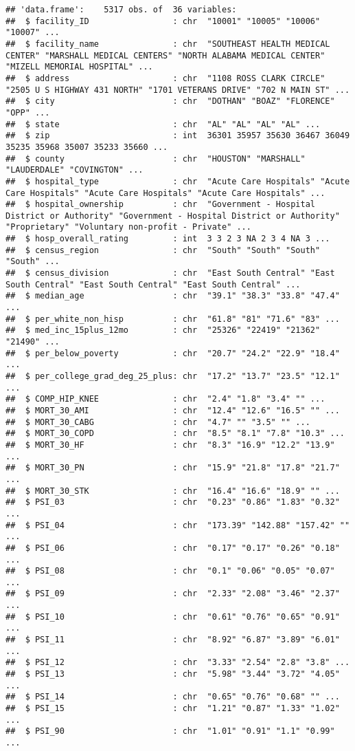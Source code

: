 \documentclass[
]{article}
\begin{document}
\begin{verbatim}
## 'data.frame':    5317 obs. of  36 variables:
##  $ facility_ID                 : chr  "10001" "10005" "10006" "10007" ...
##  $ facility_name               : chr  "SOUTHEAST HEALTH MEDICAL CENTER" "MARSHALL MEDICAL CENTERS" "NORTH ALABAMA MEDICAL CENTER" "MIZELL MEMORIAL HOSPITAL" ...
##  $ address                     : chr  "1108 ROSS CLARK CIRCLE" "2505 U S HIGHWAY 431 NORTH" "1701 VETERANS DRIVE" "702 N MAIN ST" ...
##  $ city                        : chr  "DOTHAN" "BOAZ" "FLORENCE" "OPP" ...
##  $ state                       : chr  "AL" "AL" "AL" "AL" ...
##  $ zip                         : int  36301 35957 35630 36467 36049 35235 35968 35007 35233 35660 ...
##  $ county                      : chr  "HOUSTON" "MARSHALL" "LAUDERDALE" "COVINGTON" ...
##  $ hospital_type               : chr  "Acute Care Hospitals" "Acute Care Hospitals" "Acute Care Hospitals" "Acute Care Hospitals" ...
##  $ hospital_ownership          : chr  "Government - Hospital District or Authority" "Government - Hospital District or Authority" "Proprietary" "Voluntary non-profit - Private" ...
##  $ hosp_overall_rating         : int  3 3 2 3 NA 2 3 4 NA 3 ...
##  $ census_region               : chr  "South" "South" "South" "South" ...
##  $ census_division             : chr  "East South Central" "East South Central" "East South Central" "East South Central" ...
##  $ median_age                  : chr  "39.1" "38.3" "33.8" "47.4" ...
##  $ per_white_non_hisp          : chr  "61.8" "81" "71.6" "83" ...
##  $ med_inc_15plus_12mo         : chr  "25326" "22419" "21362" "21490" ...
##  $ per_below_poverty           : chr  "20.7" "24.2" "22.9" "18.4" ...
##  $ per_college_grad_deg_25_plus: chr  "17.2" "13.7" "23.5" "12.1" ...
##  $ COMP_HIP_KNEE               : chr  "2.4" "1.8" "3.4" "" ...
##  $ MORT_30_AMI                 : chr  "12.4" "12.6" "16.5" "" ...
##  $ MORT_30_CABG                : chr  "4.7" "" "3.5" "" ...
##  $ MORT_30_COPD                : chr  "8.5" "8.1" "7.8" "10.3" ...
##  $ MORT_30_HF                  : chr  "8.3" "16.9" "12.2" "13.9" ...
##  $ MORT_30_PN                  : chr  "15.9" "21.8" "17.8" "21.7" ...
##  $ MORT_30_STK                 : chr  "16.4" "16.6" "18.9" "" ...
##  $ PSI_03                      : chr  "0.23" "0.86" "1.83" "0.32" ...
##  $ PSI_04                      : chr  "173.39" "142.88" "157.42" "" ...
##  $ PSI_06                      : chr  "0.17" "0.17" "0.26" "0.18" ...
##  $ PSI_08                      : chr  "0.1" "0.06" "0.05" "0.07" ...
##  $ PSI_09                      : chr  "2.33" "2.08" "3.46" "2.37" ...
##  $ PSI_10                      : chr  "0.61" "0.76" "0.65" "0.91" ...
##  $ PSI_11                      : chr  "8.92" "6.87" "3.89" "6.01" ...
##  $ PSI_12                      : chr  "3.33" "2.54" "2.8" "3.8" ...
##  $ PSI_13                      : chr  "5.98" "3.44" "3.72" "4.05" ...
##  $ PSI_14                      : chr  "0.65" "0.76" "0.68" "" ...
##  $ PSI_15                      : chr  "1.21" "0.87" "1.33" "1.02" ...
##  $ PSI_90                      : chr  "1.01" "0.91" "1.1" "0.99" ...
\end{verbatim}
\end{document}
